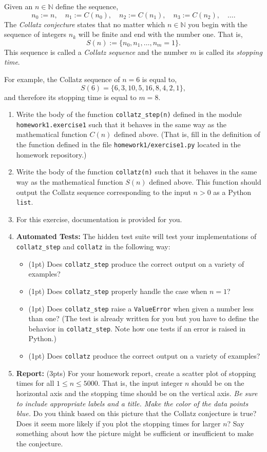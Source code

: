 \documentclass[12pt]{article}
\begin{document}
Given an $n \in \mathbb{N}$ define the sequence,
\[
  n_0 := n, \quad
  n_1 := C(n_0), \quad
  n_2 := C(n_1), \quad
  n_3 := C(n_2), \quad
  \ldots.
\]
The {\it Collatz conjecture} states that no matter which $n \in \mathbb{N}$ you
begin with the sequence of integers $n_k$ will be finite and end with the number
one. That is,
\[
  S(n) := \{n_0, n_1, \ldots, n_m = 1\}.
\]
This sequence is called a {\it Collatz sequence} and the number $m$ is called
its {\it stopping time}.

For example, the Collatz sequence of $n=6$ is equal to,
\[
  S(6) = \{6, 3, 10, 5, 16, 8, 4, 2, 1\},
\]
and therefore its stopping time is equal to $m=8$.
\begin{enumerate}
\item Write the body of the function {\tt collatz\_step(n)} defined in the
  module {\tt homework1.exercise1} such that it behaves in the same way as the
  mathematical function $C(n)$ defined above. (That is, fill in the definition
  of the function defined in the file {\tt homework1/exercise1.py} located in
  the homework repository.)
\item Write the body of the function {\tt collatz(n)} such that it behaves in
  the same way as the mathematical function $S(n)$ defined above. This function
  should output the Collatz sequence corresponding to the input $n > 0$ as a
  Python {\tt list}.
\item For this exercise, documentation is provided for you.
\item {\bf Automated Tests:} The hidden test suite will test your
  implementations of {\tt collatz\_step} and {\tt collatz} in the following way:
  \begin{itemize}
  \item (1pt) Does {\tt collatz\_step} produce the correct output on a variety
    of examples?
  \item (1pt) Does {\tt collatz\_step} properly handle the case when $n = 1$?
  \item (1pt) Does {\tt collatz\_step} raise a {\tt ValueError} when given a
    number less than one? (The test is already written for you but you have to
    define the behavior in {\tt collatz\_step}. Note how one tests if an error
    is raised in Python.)
  \item (1pt) Does {\tt collatz} produce the correct output on a variety of
    examples?
  \end{itemize}
\item {\bf Report:} (3pts) For your homework report, create a scatter plot of
  stopping times for all $1 \leq n \leq 5000$. That is, the input integer $n$
  should be on the horizontal axis and the stopping time should be on the
  vertical axis. {\it Be sure to include appropriate labels and a title. Make
    the color of the data points blue.} Do you think based on this picture that
  the Collatz conjecture is true? Does it seem more likely if you plot the
  stopping times for larger $n$? Say something about how the picture might be
  sufficient or insufficient to make the conjecture.
\end{enumerate}
\end{document}
